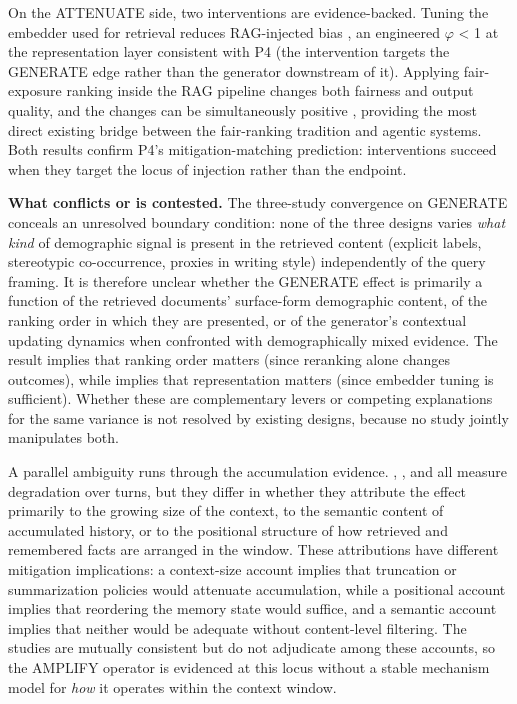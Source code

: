 \documentclass[10pt]{article}
\begin{document}
On the ATTENUATE side, two interventions are evidence-backed. Tuning the embedder used for retrieval reduces RAG-injected bias \cite{kim2025mitigating}, an engineered $\varphi$ < 1 at the representation layer consistent with P4 (the intervention targets the GENERATE edge rather than the generator downstream of it). Applying fair-exposure ranking inside the RAG pipeline changes both fairness and output quality, and the changes can be simultaneously positive \cite{kim2024fair}, providing the most direct existing bridge between the fair-ranking tradition \cite{zehlike2022fairness} and agentic systems. Both results confirm P4's mitigation-matching prediction: interventions succeed when they target the locus of injection rather than the endpoint.

\textbf{What conflicts or is contested.} The three-study convergence on GENERATE conceals an unresolved boundary condition: none of the three designs varies \emph{what kind} of demographic signal is present in the retrieved content (explicit labels, stereotypic co-occurrence, proxies in writing style) independently of the query framing. It is therefore unclear whether the GENERATE effect is primarily a function of the retrieved documents' surface-form demographic content, of the ranking order in which they are presented, or of the generator's contextual updating dynamics when confronted with demographically mixed evidence. The \cite{kim2024fair} result implies that ranking order matters (since reranking alone changes outcomes), while \cite{kim2025mitigating} implies that representation matters (since embedder tuning is sufficient). Whether these are complementary levers or competing explanations for the same variance is not resolved by existing designs, because no study jointly manipulates both.

A parallel ambiguity runs through the accumulation evidence. \cite{fan2024fairmt}, \cite{geng2025accumulating}, and \cite{simhi2026old} all measure degradation over turns, but they differ in whether they attribute the effect primarily to the growing size of the context, to the semantic content of accumulated history, or to the positional structure of how retrieved and remembered facts are arranged in the window. These attributions have different mitigation implications: a context-size account implies that truncation or summarization policies would attenuate accumulation, while a positional account implies that reordering the memory state would suffice, and a semantic account implies that neither would be adequate without content-level filtering. The studies are mutually consistent but do not adjudicate among these accounts, so the AMPLIFY operator is evidenced at this locus without a stable mechanism model for \emph{how} it operates within the context window.
\end{document}
